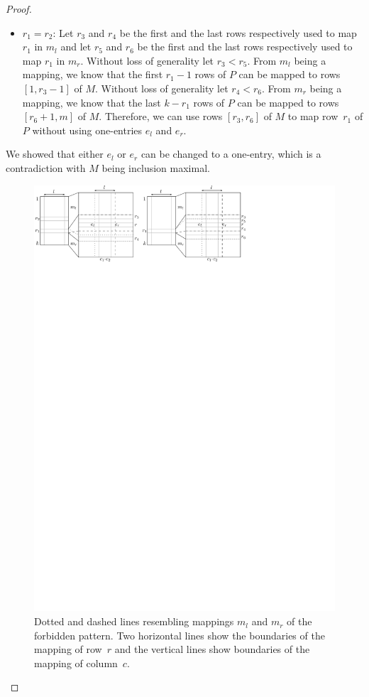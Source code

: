 \begin{proof}
\begin{itemize}
\begin{itemize}
		\item $r_1=r_2$: Let $r_3$ and $r_4$ be the first and the last rows respectively used to map $r_1$ in $m_l$ and let $r_5$ and $r_6$ be the first and the last rows respectively used to map $r_1$ in $m_r$. Without loss of generality let $r_3<r_5$. From $m_l$ being a mapping, we know that the first $r_1-1$ rows of $P$ can be mapped to rows $[1,r_3-1]$ of $M$. Without loss of generality let $r_4<r_6$. From $m_r$ being a mapping, we know that the last $k-r_1$ rows of $P$ can be mapped to rows $[r_6+1,m]$ of $M$. Therefore, we can use rows $[r_3,r_6]$ of $M$ to map row~$r_1$ of $P$ without using one-entries $e_l$ and $e_r$.
	\end{itemize}
\end{itemize}
We showed that either $e_l$ or $e_r$ can be changed to a one-entry, which is a contradiction with $M$ being inclusion maximal.

\begin{figure}[!ht]
\centering
\includegraphics[width=\textwidth]{img/emptymid.pdf}
\caption{Dotted and dashed lines resembling mappings $m_l$ and $m_r$ of the forbidden pattern. Two horizontal lines show the boundaries of the mapping of row~$r$ and the vertical lines show boundaries of the mapping of column~$c$.}
\label{fig:emptymid}
\end{figure}
\end{proof}

